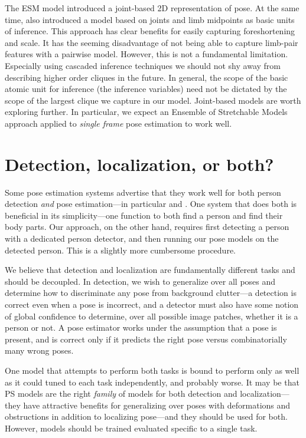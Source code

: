 The ESM model introduced a joint-based 2D representation of pose.  At the same 
time, \citet{deva2011} also introduced a model based on joints and limb 
midpoints as basic units of inference.  This approach has clear benefits for 
easily capturing foreshortening and scale.  It has the seeming disadvantage of 
not being able to capture limb-pair features with a pairwise model.  However, 
this is not a fundamental limitation.  Especially using cascaded inference 
techniques we should not shy away from describing higher order cliques in the 
future.  In general, the scope of the basic atomic unit for inference (the 
inference variables) need not be dictated by the scope of the largest clique we 
capture in our model.  Joint-based models are worth exploring further.  In 
particular, we expect an Ensemble of Stretchable Models approach applied to 
{\em single frame} pose estimation to work well.

\section{Detection, localization, or both?}

Some pose estimation systems advertise that they work well for both person 
detection {\em and} pose estimation---in particular \citet{andriluka09} and 
\citet{deva2011}.  One system that does both is beneficial in its 
simplicity---one function to both find a person and find their body parts.  Our 
approach, on the other hand, requires first detecting a person with a dedicated 
person detector, and then running our pose models on the detected person.  This 
is a slightly more cumbersome procedure. 

We believe that detection and localization are fundamentally different tasks 
and should be decoupled.  In detection, we wish to generalize over all poses 
and determine how to discriminate any pose from background clutter---a 
detection is correct even when a pose is incorrect, and a detector must also 
have some notion of global confidence to determine, over all possible image 
patches, whether it is a person or not.  A pose estimator works under the 
assumption that a pose is present, and is correct only if it predicts the right 
pose versus combinatorially many wrong poses.

One model that attempts to perform both tasks is bound to perform only as well 
as it could tuned to each task independently, and probably worse.  It may be 
that PS models are the right {\em family} of models for both detection and 
localization---they have attractive benefits for generalizing over poses with 
deformations and obstructions in addition to localizing pose---and they should 
be used for both.  However, models should be trained evaluated specific to a 
single task.

